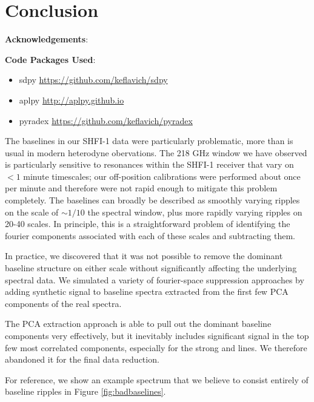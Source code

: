 \section{Conclusion}


\textbf{Acknowledgements}:

\textbf{Code Packages Used}:

\begin{itemize}
    \item sdpy \url{https://github.com/keflavich/sdpy}
    \item aplpy \url{http://aplpy.github.io}
    \item pyradex \url{https://github.com/keflavich/pyradex}
\end{itemize}

The baselines in our SHFI-1 data were particularly problematic, more than is
usual in modern heterodyne obervations.  The 218 GHz window we have observed is
particularly sensitive to resonances within the SHFI-1 receiver that vary on
$<1$ minute timescales; our off-position calibrations were performed about once
per minute and therefore were not rapid enough to mitigate this problem
completely.  The baselines can broadly be described as smoothly varying ripples
on the scale of $\sim1/10$ the spectral window, plus more rapidly varying
ripples on 20-40 \kms scales.  In principle, this is a straightforward problem
of identifying the fourier components associated with each of these scales and
subtracting them.

In practice, we discovered that it was not possible to remove the dominant
baseline structure on either scale without significantly affecting the
underlying spectral data.  We simulated a variety of fourier-space suppression
approaches by adding synthetic signal to baseline spectra extracted from the
first few PCA components of the real spectra.

The PCA extraction approach is able to pull out the dominant baseline
components very effectively, but it inevitably includes significant signal in
the top few most correlated components, especially for the strong \formaldehyde
and \thirteenco lines.  We therefore abandoned it for the final data reduction.

For reference, we show an example spectrum that we believe to consist entirely
of baseline ripples in Figure \ref{fig:badbaselines}.


